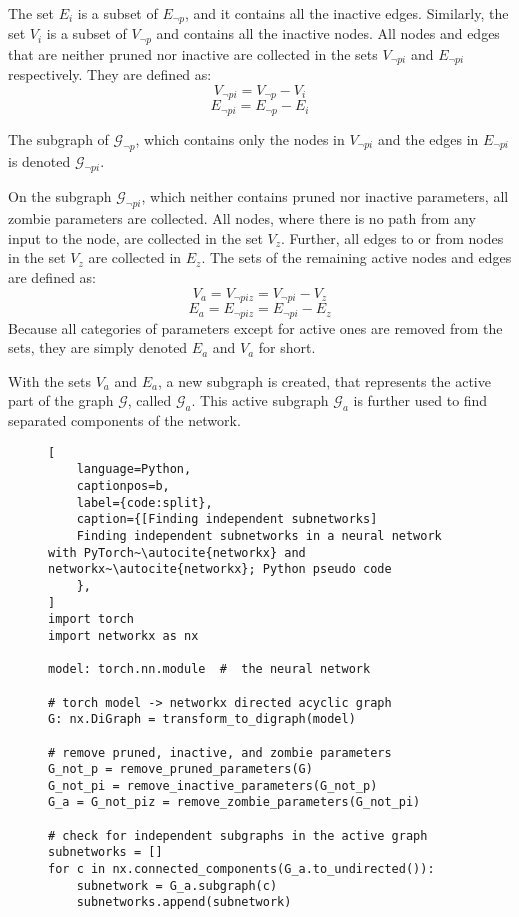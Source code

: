 The set $E_i$ is a subset of $E_{\neg p}$, and it contains all the inactive edges.
Similarly, the set $V_i$ is a subset of $V_{\neg p}$ and contains all the inactive nodes.
All nodes and edges that are neither pruned nor inactive are collected in the sets $V_{\neg pi}$ and $E_{\neg pi}$ respectively.
They are defined as:
\[ V_{\neg pi} = V_{\neg p} - V_i \]
\[ E_{\neg pi} = E_{\neg p} - E_i \]

The subgraph of $\mathcal{G}_{\neg p}$, which contains only the nodes in $V_{\neg pi}$ and the edges in $E_{\neg pi}$ is denoted $\mathcal{G}_{\neg pi}$.

On the subgraph $\mathcal{G}_{\neg pi}$, which neither contains pruned nor inactive parameters, all zombie parameters are collected.
All nodes, where there is no path from any input to the node, are collected in the set $V_z$.
Further, all edges to or from nodes in the set $V_z$ are collected in $E_z$.
The sets of the remaining active nodes and edges are defined as:
\[ V_a = V_{\neg piz} = V_{\neg pi} - V_z \]
\[ E_a = E_{\neg piz} = E_{\neg pi} - E_z \]
Because all categories of parameters except for active ones are removed from the sets, they are simply denoted $E_a$ and $V_a$ for short.

With the sets $V_a$ and $E_a$, a new subgraph is created, that represents the active part of the graph $\mathcal{G}$, called $\mathcal{G}_a$.
This active subgraph $\mathcal{G}_a$ is further used to find separated components of the network.

\begin{figure}[ht] %
\centering
\begin{minipage}{\linewidth}
\begin{lstlisting}[
    language=Python,
    captionpos=b, 
    label={code:split},
    caption={[Finding independent subnetworks]
    Finding independent subnetworks in a neural network with PyTorch~\autocite{networkx} and networkx~\autocite{networkx}; Python pseudo code
    },
]
import torch
import networkx as nx

model: torch.nn.module  #  the neural network

# torch model -> networkx directed acyclic graph
G: nx.DiGraph = transform_to_digraph(model)

# remove pruned, inactive, and zombie parameters
G_not_p = remove_pruned_parameters(G)
G_not_pi = remove_inactive_parameters(G_not_p)
G_a = G_not_piz = remove_zombie_parameters(G_not_pi)

# check for independent subgraphs in the active graph
subnetworks = []
for c in nx.connected_components(G_a.to_undirected()):
    subnetwork = G_a.subgraph(c)
    subnetworks.append(subnetwork)
\end{lstlisting}
\end{minipage}
\end{figure}

